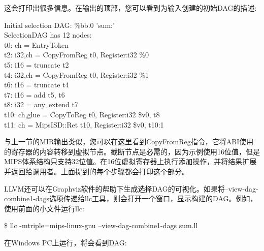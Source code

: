 这会打印出很多信息。在输出的顶部，您可以看到为输入创建的初始DAG的描述:\par

\begin{tcolorbox}[colback=white,colframe=black]
Initial selection DAG: \%bb.0 'sum:' \\
SelectionDAG has 12 nodes: \\
\hspace*{0.5cm}t0: ch = EntryToken \\
\hspace*{2.5cm}t2: i32,ch = CopyFromReg t0, Register:i32 \%0 \\
\hspace*{2cm}t5: i16 = truncate t2 \\
\hspace*{2.5cm}t4: i32,ch = CopyFromReg t0, Register:i32 \%1 \\
\hspace*{2cm}t6: i16 = truncate t4 \\
\hspace*{1.5cm}t7: i16 = add t5, t6 \\
\hspace*{1cm}t8: i32 = any\underline{~}extend t7 \\
\hspace*{0.5cm}t10: ch,glue = CopyToReg t0, Register:i32 \$v0, t8 \\
\hspace*{0.5cm}t11: ch = MipsISD::Ret t10, Register:i32 \$v0, t10:1 
\end{tcolorbox}

与上一节的MIR输出类似，您可以在这里看到CopyFromReg指令，它将ABI使用的寄存器的内容转移到虚拟节点。截断节点是必需的，因为示例使用16位值，但是MIPS体系结构只支持32位值。在16位虚拟寄存器上执行添加操作，并将结果扩展并返回给调用者。上面提到的每个步骤都会打印这个部分。\par

LLVM还可以在Graphviz软件的帮助下生成选择DAG的可视化。如果将–view-dag-combine1-dags选项传递给llc工具，则会打开一个窗口，显示构建的DAG。例如，使用前面的小文件运行llc:\par

\begin{tcolorbox}[colback=white,colframe=black]
\$ llc -mtriple=mips-linux-gnu –view-dag-combine1-dags sum.ll
\end{tcolorbox}

在Windows PC上运行，将会看到DAG:\par

